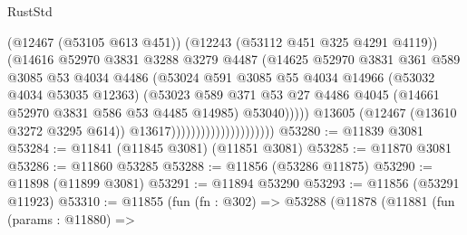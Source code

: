 \begin{lexlean}{RustStd}
\begin{coremodule}
                                                (@12467 (@53105 @613 @451))
                                                (@12243 (@53112 @451 @325 @4291 @4119))
                                                (@14616
                                                  @52970
                                                  @3831
                                                  @3288
                                                  @3279
                                                  @4487
                                                  (@14625
                                                    @52970
                                                    @3831
                                                    @361
                                                    @589
                                                    @3085
                                                    @53
                                                    @4034
                                                    @4486
                                                    (@53024
                                                      @591
                                                      @3085
                                                      @55
                                                      @4034
                                                      @14966
                                                      (@53032 @4034 @53035 @12363)
                                                      (@53023
                                                        @589
                                                        @371
                                                        @53
                                                        @27
                                                        @4486
                                                        @4045
                                                        (@14661 @52970 @3831 @586 @53 @4485 @14985)
                                                        @53040)))))
                                              @13605
                                              (@12467 (@13610 @3272 @3295 @614))
                                              @13617)))))))))))))))))))))
@53280 := @11839 @3081
@53284 := @11841 (@11845 @3081) (@11851 @3081)
@53285 := @11870 @3081
@53286 := @11860 @53285
@53288 := @11856 (@53286 @11875)
@53290 := @11898 (@11899 @3081)
@53291 := @11894 @53290
@53293 := @11856 (@53291 @11923)
@53310 := @11855
    (fun (fn : @302) =>
    @53288
      (@11878
        (@11881
          (fun (params : @11880) =>

\end{coremodule}
\end{lexlean}
